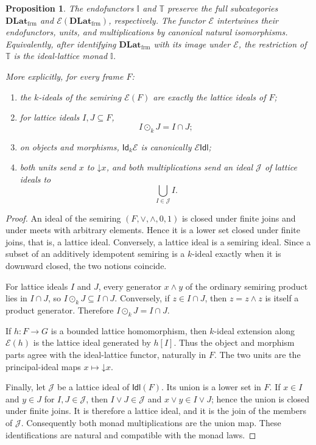 \documentclass[12pt,leqno]{amsart}
\newcommand{\DLatFrm}{\mathbf{DLat}_{\mathrm{frm}}}
\newcommand{\Idk}{\mathsf{Id}_{k}}
\newtheorem{proposition}[theorem]{Proposition}
\theoremstyle{definition}
\numberwithin{equation}{section}
\theoremstyle{remark}
\begin{document}
\begin{proposition}\label{prop:monad-frame-comparison}
The endofunctors \(\mathbb I\) and \(\mathbb T\) preserve the full subcategories \(\DLatFrm\) and \(\mathcal E(\DLatFrm)\), respectively. The functor \(\mathcal E\) intertwines their endofunctors, units, and multiplications by canonical natural isomorphisms. Equivalently, after identifying \(\DLatFrm\) with its image under \(\mathcal E\), the restriction of \(\mathbb T\) is the ideal-lattice monad \(\mathbb I\).

More explicitly, for every frame $F$:
\begin{enumerate}
\item the $k$-ideals of the semiring \(\mathcal E(F)\) are exactly the lattice ideals of $F$;
\item for lattice ideals $I,J\subseteq F$,
\[
I\odot_kJ=I\cap J;
\]
\item on objects and morphisms, \(\Idk\mathcal E\) is canonically \(\mathcal E\mathsf{Idl}\);
\item both units send \(x\) to \(\mathord\downarrow x\), and both multiplications send an ideal \(\mathcal J\) of lattice ideals to
\[
\bigcup_{I\in\mathcal J}I.
\]
\end{enumerate}
\end{proposition}

\begin{proof}
An ideal of the semiring \((F,\vee,\wedge,0,1)\) is closed under finite joins and under meets with arbitrary elements. Hence it is a lower set closed under finite joins, that is, a lattice ideal. Conversely, a lattice ideal is a semiring ideal. Since a subset of an additively idempotent semiring is a $k$-ideal exactly when it is downward closed, the two notions coincide.

For lattice ideals $I$ and $J$, every generator $x\wedge y$ of the ordinary semiring product lies in $I\cap J$, so
\(I\odot_kJ\subseteq I\cap J\). Conversely, if $z\in I\cap J$, then
\(z=z\wedge z\) is itself a product generator. Therefore
\(I\odot_kJ=I\cap J\).

If \(h\colon F\to G\) is a bounded lattice homomorphism, then $k$-ideal extension along \(\mathcal E(h)\) is the lattice ideal generated by $h[I]$. Thus the object and morphism parts agree with the ideal-lattice functor, naturally in $F$. The two units are the principal-ideal maps \(x\mapsto\mathord\downarrow x\).

Finally, let \(\mathcal J\) be a lattice ideal of \(\mathsf{Idl}(F)\). Its union is a lower set in $F$. If $x\in I$ and $y\in J$ for $I,J\in\mathcal J$, then
\(I\vee J\in\mathcal J\) and $x\vee y\in I\vee J$; hence the union is closed under finite joins. It is therefore a lattice ideal, and it is the join of the members of \(\mathcal J\). Consequently both monad multiplications are the union map. These identifications are natural and compatible with the monad laws.
\end{proof}
\end{document}

